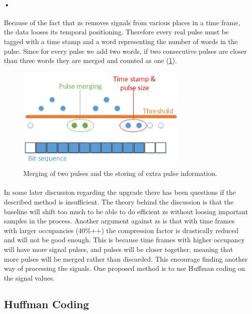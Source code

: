 \documentclass[a4paper, 12pt]{report}\dfrac{\right }{•}
\begin{document}
\paragraph{•}
Because of the fact that \gls{zs} removes signals from various places in a time frame, the data looses its temporal positioning.
Therefore every real pulse must be tagged with a time stamp and a word representing the number of words in the pulse.
Since for every pulse we add two words, if two consecutive pulses are closer than three words they are merged and counted as one (\ref{fig:merge}).

\begin{figure}[h!]
	\centering
		\includegraphics[width=0.75\textwidth]{images/merge.png}
		\caption{Merging of two pulses and the storing of extra pulse information.}
		\label{fig:merge}
\end{figure}

\paragraph{}
In some later discussion regarding the upgrade there has been questions if the described method is insufficient.
The theory behind the discussion is that the baseline will shift too much to be able to do efficient \gls{zs} without loosing important samples in the process.
Another argument against \gls{zs} is that with time frames with larger occupancies (40\%++) the compression factor is drastically reduced and will not be good enough.
This is because time frames with higher occupancy will have more signal pulses, and pulses will be closer together, meaning that more pulses will be merged rather than discarded. 
This encourage finding another way of processing the signals.
One proposed method is to use Huffman coding on the signal values.

\subsection{Huffman Coding} %
\end{document}
